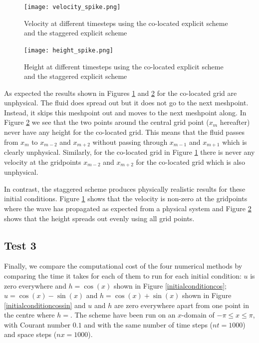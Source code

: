 \documentclass[a4paper, 10.5pt, notitlepage]{article}
\begin{document}
\begin{figure} [H]
	\begin{center}
	\begin{minipage}{.6\textwidth}
		\ContinuedFloat*
		\captionsetup{width=1.5\textwidth}
		\captionsetup{justification=centering}
		\texttt{[image: velocity\_spike.png]}
		\caption{\label{velocity_spike} Velocity at different timesteps using the co-located explicit scheme and the staggered explicit scheme} 
	\end{minipage}
\end{center}
\end{figure}
\begin{figure}[H]
	\begin{center}
	\begin{minipage}{.6\textwidth}
		\ContinuedFloat
		\captionsetup{width=1.5\textwidth}
		\captionsetup{justification=centering}
		\texttt{[image: height\_spike.png]}
		\caption{\label{height_spike} Height at different timesteps using the co-located explicit scheme and the staggered explicit scheme} 
	\end{minipage}
\end{center}
\end{figure}

As expected the results shown in Figures \ref{velocity_spike} and \ref{height_spike} for the co-located grid are unphysical. The fluid does spread out but it does not go to the next meshpoint. Instead, it skips this meshpoint out and moves to the next meshpoint along. In Figure \ref{height_spike} we see that the two points around the central grid point ($x_{m}$ hereafter) never have any height for the co-located grid. This means that the fluid passes from $x_{m}$ to $x_{m-2}$ and $x_{m+ 2}$ without passing through $x_{m-1}$ and $x_{m+1}$ which is clearly unphysical. Similarly, for the co-located grid in Figure \ref{velocity_spike} there is never any velocity at the gridpoints $x_{m-2}$ and $x_{m+2}$ for the co-located grid which is also unphysical. 

In contrast, the staggered scheme produces physically realistic results for these initial conditions. Figure \ref{velocity_spike} shows that the velocity is non-zero at the gridpoints where the wave has propagated as expected from a physical system and Figure \ref{height_spike} shows that the height spreads out evenly using all grid points.


\subsection{Test 3}
Finally, we compare the computational cost of the four numerical methods by comparing the time it takes for each of them to run for each initial condition: $u$ is zero everywhere and $h= \cos(x)$ shown in Figure \ref{initialconditioncos}; $u = \cos(x) - \sin(x)$ and $h = \cos(x) + \sin(x)$ shown in Figure \ref{initialconditioncossin} and $u$ and $h$ are zero everywhere apart from one point in the centre where $h = $. The scheme have been run on an $x$-domain of $-\pi \leq x \leq \pi$, with Courant number $0.1$ and with the same number of time steps ($nt = 1000$) and space steps ($nx = 1000$).
\end{document}
